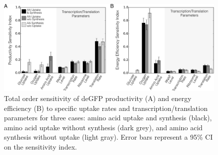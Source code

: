 \documentclass[journal=asbcd6,manuscript=article]{achemso}
\begin{document}
\begin{figure}[t!]
\includegraphics[width=1.00\textwidth]{./Figures/Sensitivity.pdf}
\caption{Total order sensitivity of deGFP productivity (A) and energy efficiency (B) to specific uptake rates and transcription/translation parameters for three cases: amino acid uptake and synthesis (black), amino acid uptake without synthesis (dark grey), and amino acid synthesis without uptake (light gray). Error bars represent a 95\% CI on the sensitivity index.}
\label{fig:SI}
\end{figure}
\end{document}
